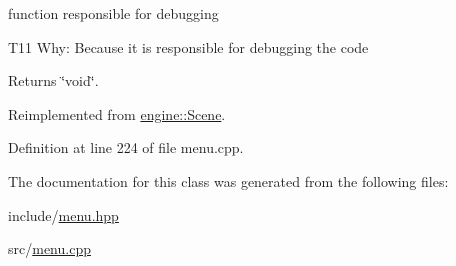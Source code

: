 function responsible for debugging 


\begin{DoxyItemize}
\item T11 Why\+: Because it is responsible for debugging the code

\begin{DoxyReturn}{Returns}
\char`\"{}void\char`\"{}. 
\end{DoxyReturn}

\end{DoxyItemize}

Reimplemented from \hyperlink{classengine_1_1_scene_afdc5c5539730b162ddb6fd99b0c0660c}{engine\+::\+Scene}.



Definition at line 224 of file menu.\+cpp.



The documentation for this class was generated from the following files\+:\begin{DoxyCompactItemize}
\item 
include/\hyperlink{menu_8hpp}{menu.\+hpp}\item 
src/\hyperlink{menu_8cpp}{menu.\+cpp}\end{DoxyCompactItemize}
